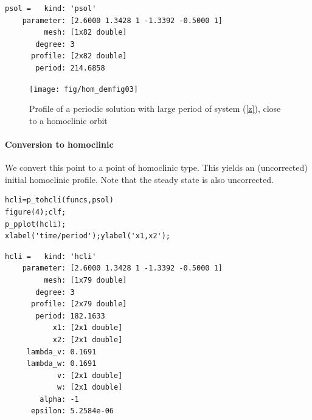 \documentclass[10pt]{scrartcl}
\begin{document}
{\small
\begin{verbatim}
psol =   kind: 'psol'
    parameter: [2.6000 1.3428 1 -1.3392 -0.5000 1]
         mesh: [1x82 double]
       degree: 3
      profile: [2x82 double]
       period: 214.6858
\end{verbatim}
\begin{figure}[ht]
\begin{center}
\texttt{[image: fig/hom\_demfig03]}
\caption{\label{demo3-3}Profile of a periodic solution with large period of
system (\ref{z}), close
to a homoclinic orbit}
\end{center}
\end{figure}

\paragraph{Conversion to homoclinic}
We convert this point to a point of homoclinic type. This yields an 
(uncorrected) initial homoclinic profile.  Note that the steady state is also 
uncorrected.
\begin{lstlisting}
hcli=p_tohcli(funcs,psol)
figure(4);clf;
p_pplot(hcli);
xlabel('time/period');ylabel('x1,x2');
\end{lstlisting}
{\small
\begin{verbatim}
hcli =   kind: 'hcli'
    parameter: [2.6000 1.3428 1 -1.3392 -0.5000 1]
         mesh: [1x79 double]
       degree: 3
      profile: [2x79 double]
       period: 182.1633
           x1: [2x1 double]
           x2: [2x1 double]
     lambda_v: 0.1691
     lambda_w: 0.1691
            v: [2x1 double]
            w: [2x1 double]
        alpha: -1
      epsilon: 5.2584e-06
\end{verbatim}
}
}
\end{document}
